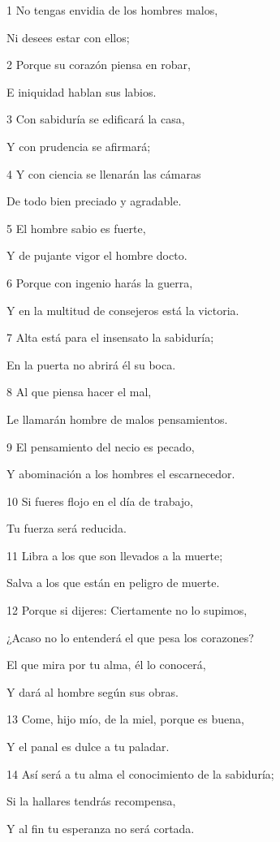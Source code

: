 \par 1 No tengas envidia de los hombres malos,
\par Ni desees estar con ellos;
\par 2 Porque su corazón piensa en robar,
\par E iniquidad hablan sus labios.
\par 3 Con sabiduría se edificará la casa,
\par Y con prudencia se afirmará;
\par 4 Y con ciencia se llenarán las cámaras
\par De todo bien preciado y agradable.
\par 5 El hombre sabio es fuerte,
\par Y de pujante vigor el hombre docto.
\par 6 Porque con ingenio harás la guerra,
\par Y en la multitud de consejeros está la victoria.
\par 7 Alta está para el insensato la sabiduría;
\par En la puerta no abrirá él su boca.
\par 8 Al que piensa hacer el mal,
\par Le llamarán hombre de malos pensamientos.
\par 9 El pensamiento del necio es pecado,
\par Y abominación a los hombres el escarnecedor.
\par 10 Si fueres flojo en el día de trabajo,
\par Tu fuerza será reducida.
\par 11 Libra a los que son llevados a la muerte;
\par Salva a los que están en peligro de muerte.
\par 12 Porque si dijeres: Ciertamente no lo supimos,
\par ¿Acaso no lo entenderá el que pesa los corazones?
\par El que mira por tu alma, él lo conocerá,
\par Y dará al hombre según sus obras.
\par 13 Come, hijo mío, de la miel, porque es buena,
\par Y el panal es dulce a tu paladar.
\par 14 Así será a tu alma el conocimiento de la sabiduría;
\par Si la hallares tendrás recompensa,
\par Y al fin tu esperanza no será cortada.
